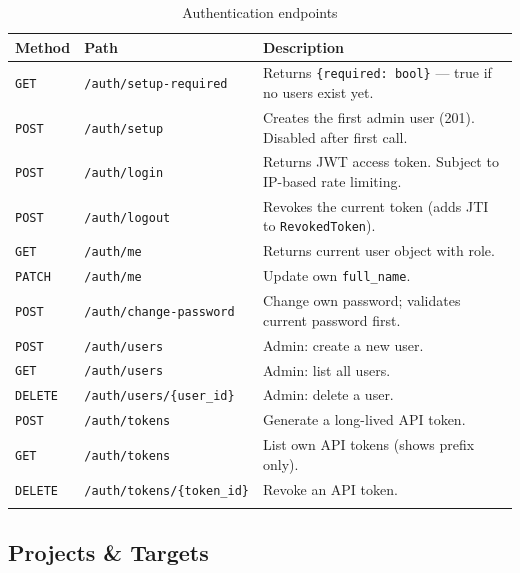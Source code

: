 \documentclass[11pt,a4paper,twoside,openright]{book}
\newcommand{\mget}{\colorbox{SeraphLow}{\color{white}\texttt{\footnotesize GET}}}
\newcommand{\mpost}{\colorbox{SeraphAccent}{\color{SeraphBg}\texttt{\footnotesize POST}}}
\newcommand{\mpatch}{\colorbox{SeraphViolet}{\color{SeraphBg}\texttt{\footnotesize PATCH}}}
\newcommand{\mdelete}{\colorbox{SeraphCrit}{\color{white}\texttt{\footnotesize DELETE}}}
\begin{document}
\begin{longtable}{L{1.2cm} L{5.5cm} X}
\toprule
\textbf{Method} & \textbf{Path} & \textbf{Description} \\
\midrule
\endhead
\mget    & \texttt{/auth/setup-required}        & Returns \texttt{\{required: bool\}} — true if no users exist yet. \\
\mpost   & \texttt{/auth/setup}                 & Creates the first admin user (201). Disabled after first call. \\
\mpost   & \texttt{/auth/login}                 & Returns JWT access token. Subject to IP-based rate limiting. \\
\mpost   & \texttt{/auth/logout}                & Revokes the current token (adds JTI to \texttt{RevokedToken}). \\
\mget    & \texttt{/auth/me}                    & Returns current user object with role. \\
\mpatch  & \texttt{/auth/me}                    & Update own \texttt{full\_name}. \\
\mpost   & \texttt{/auth/change-password}       & Change own password; validates current password first. \\
\mpost   & \texttt{/auth/users}                 & Admin: create a new user. \\
\mget    & \texttt{/auth/users}                 & Admin: list all users. \\
\mdelete & \texttt{/auth/users/\{user\_id\}}    & Admin: delete a user. \\
\mpost   & \texttt{/auth/tokens}                & Generate a long-lived API token. \\
\mget    & \texttt{/auth/tokens}                & List own API tokens (shows prefix only). \\
\mdelete & \texttt{/auth/tokens/\{token\_id\}}  & Revoke an API token. \\
\bottomrule
\caption{Authentication endpoints}
\end{longtable}

\subsection{Projects \& Targets}
\end{document}
